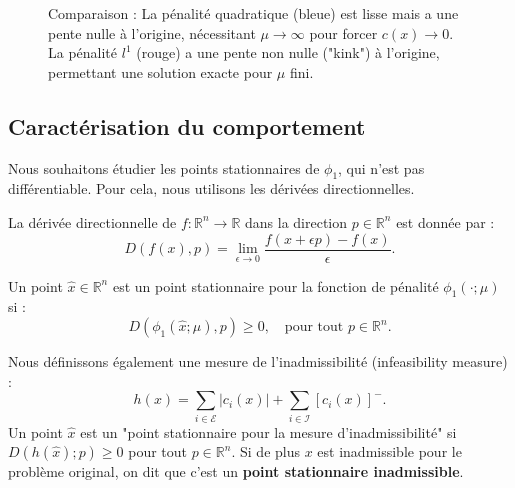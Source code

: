 \begin{figure}[H]
    \centering
    \caption{Comparaison : La pénalité quadratique (bleue) est lisse mais a une pente nulle à l'origine, nécessitant $\mu \to \infty$ pour forcer $c(x) \to 0$. La pénalité $l^1$ (rouge) a une pente non nulle ("kink") à l'origine, permettant une solution exacte pour $\mu$ fini.}
\end{figure}

\subsection{Caractérisation du comportement}

Nous souhaitons étudier les points stationnaires de $\phi_1$, qui n'est pas différentiable.
Pour cela, nous utilisons les dérivées directionnelles.

\begin{definition}
    La dérivée directionnelle de $f: \mathbb{R}^n \to \mathbb{R}$ dans la direction $p \in \mathbb{R}^n$ est donnée par :
    \[
        D(f(x), p) = \lim_{\epsilon \to 0} \frac{f(x + \epsilon p) - f(x)}{\epsilon}.
    \]
\end{definition}

\begin{definition}[Stationnarité]
    Un point $\hat{x} \in \mathbb{R}^n$ est un point stationnaire pour la fonction de pénalité $\phi_1(\cdot; \mu)$ si :
    \[
        D(\phi_1(\hat{x}; \mu), p) \ge 0, \quad \text{pour tout } p \in \mathbb{R}^n.
    \]
\end{definition}

Nous définissons également une mesure de l'inadmissibilité (infeasibility measure) :
\[
    h(x) = \sum_{i \in \mathcal{E}} |c_i(x)| + \sum_{i \in \mathcal{I}} [c_i(x)]^-.
\]
Un point $\hat{x}$ est un "point stationnaire pour la mesure d'inadmissibilité" si $D(h(\hat{x}); p) \ge 0$ pour tout $p \in \mathbb{R}^n$.
Si de plus $x$ est inadmissible pour le problème original, on dit que c'est un \textbf{point stationnaire inadmissible}.

